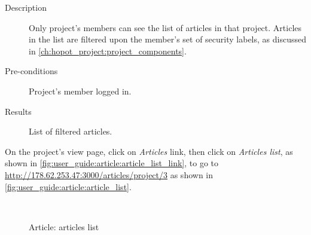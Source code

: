 \begin{description}
\item[Description] Only project's members can see the list of articles in that project.
Articles in the list are filtered upon the member's set of security labels, as discussed in \autoref{ch:hopot_project:project_components}.
\item[Pre-conditions] Project's member logged in.
\item[Results] List of filtered articles.
\end{description}

On the project's view page, click on \emph{Articles} link, then click on \emph{Articles list}, as shown in \autoref{fig:user_guide:article:article_list_link}, to go to \href{http://178.62.253.47:3000/articles/project/3}{http://178.62.253.47:3000/articles/project/3} as shown in \autoref{fig:user_guide:article:article_list}.

\begin{figure}[bth]
\myfloatalign
{} \quad
{} \\
\caption[Article: articles list]{Article: articles list}
\label{fig:user_guide:article:article_list}
\end{figure}


